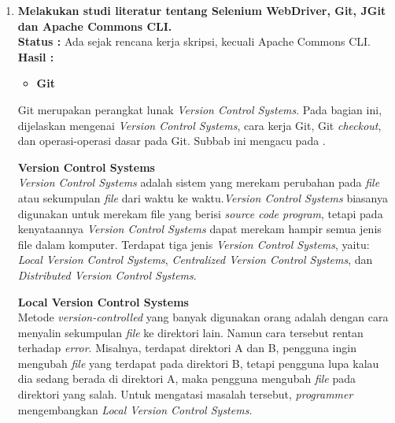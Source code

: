 \documentclass[a4paper,twoside]{article}
\begin{document}
	\begin{enumerate}
		\item \textbf{Melakukan studi literatur tentang Selenium WebDriver, Git, JGit dan Apache Commons CLI.}\\
		{\bf Status :} Ada sejak rencana kerja skripsi, kecuali Apache Commons CLI. \\
		{\bf Hasil :} \\

\begin{itemize}
\item \textbf{Git}\\
\end{itemize}
Git merupakan perangkat lunak \textit{Version Control Systems}. Pada bagian ini, dijelaskan mengenai \textit{Version Control Systems}, cara kerja Git, Git \textit{checkout}, dan operasi-operasi dasar pada Git. Subbab ini mengacu pada \cite{chacon2014pro}.   

\textbf{Version Control Systems}\\
\textit{Version Control Systems} adalah sistem yang merekam perubahan pada \textit{file} atau sekumpulan \textit{file} dari waktu ke waktu.\textit{Version Control Systems} biasanya digunakan  untuk merekam file yang berisi \textit{source code program}, tetapi pada kenyataannya \textit{Version Control Systems} dapat merekam hampir semua jenis file dalam komputer. Terdapat tiga jenis \textit{Version Control Systems}, yaitu: \textit{Local Version Control Systems}, \textit{Centralized Version Control Systems}, dan \textit{Distributed Version Control Systems}.

\textbf{Local Version Control Systems}\\
Metode \textit{version-controlled} yang banyak digunakan orang adalah dengan cara menyalin sekumpulan \textit{file} ke direktori lain. Namun cara tersebut rentan terhadap \textit{error}.
Misalnya, terdapat direktori A dan B, pengguna ingin mengubah \textit{file} yang terdapat pada direktori B, tetapi pengguna lupa kalau dia sedang berada di direktori A, maka pengguna mengubah \textit{file} pada direktori yang salah. Untuk mengatasi masalah tersebut, \textit{programmer} mengembangkan \textit{Local Version Control Systems}. 


\end{enumerate}
\end{document}
